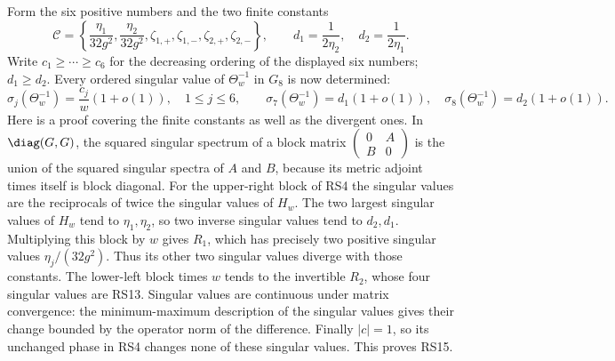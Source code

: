 Form the six positive numbers and the two finite constants
\begin{equation}
 \mathcal C=
 \left\{\frac{\eta_1}{32g^2},\frac{\eta_2}{32g^2},
 \zeta_{1,+},\zeta_{1,-},\zeta_{2,+},\zeta_{2,-}\right\},
 \qquad d_1=\frac1{2\eta_2},\quad d_2=\frac1{2\eta_1}.
 \tag{RS14}
\end{equation}
Write $c_1\ge\cdots\ge c_6$ for the decreasing ordering of
the displayed six numbers; $d_1\ge d_2$. Every ordered singular
value of $\Theta_w^{-1}$ in $G_8$ is now determined:
\begin{equation}
 \sigma_j(\Theta_w^{-1})=\frac{c_j}{w}(1+o(1)),\quad 1\le j\le6,
 \qquad
 \sigma_7(\Theta_w^{-1})=d_1(1+o(1)),\quad
 \sigma_8(\Theta_w^{-1})=d_2(1+o(1)).
 \tag{RS15}
\end{equation}
Here is a proof covering the finite constants as well as the
divergent ones. In $\diag(G,G)$, the squared singular spectrum
of a block matrix $\left(\begin{smallmatrix}0&A\\B&0\end{smallmatrix}\right)$
is the union of the squared singular spectra of $A$ and $B$,
because its metric adjoint times itself is block diagonal.
For the upper-right block of RS4 the singular values are the
reciprocals of twice the singular values of $H_w$. The two
largest singular values of $H_w$ tend to $\eta_1,\eta_2$,
so two inverse singular values tend to $d_2,d_1$.
Multiplying this block by $w$ gives $R_1$, which has precisely
two positive singular values $\eta_j/(32g^2)$. Thus its other
two singular values diverge with those constants. The lower-left
block times $w$ tends to the invertible $R_2$, whose four
singular values are RS13. Singular values are continuous under
matrix convergence: the minimum-maximum description of the
singular values gives their change bounded by the operator norm
of the difference. Finally $|c|=1$, so its unchanged phase in
RS4 changes none of these singular values. This proves RS15.

